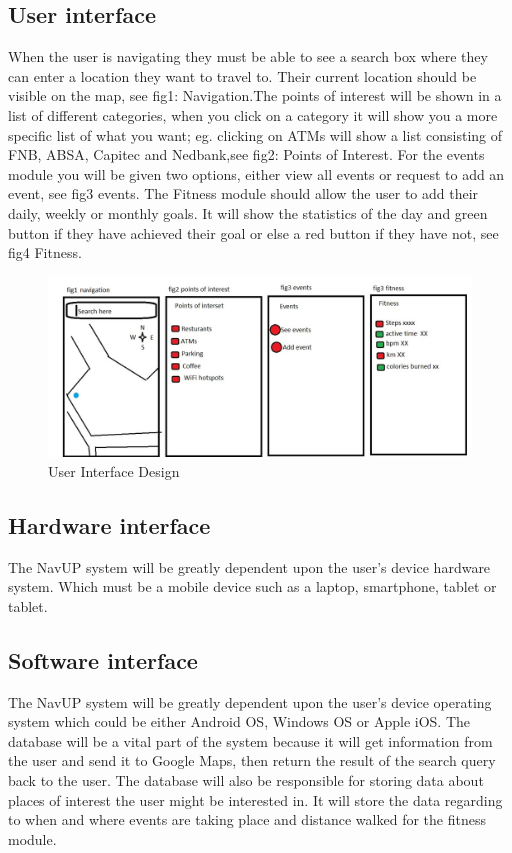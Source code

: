 \documentclass[12pt,a4paper]{article}
\begin{document}
        \subsection{User interface}
        When the user is navigating they must be able to see a search box where they can enter a location they want to travel to. Their current location should be visible on the map, see fig1: Navigation.The points of interest will be shown in a list of different categories, when you click on a category it will show you a more specific list of what you want; eg. clicking on ATMs will show a list consisting of FNB, ABSA, Capitec and Nedbank,see fig2: Points of Interest. For the events module you will be given two options, either view all events or request to add an event, see fig3 events. The Fitness module should allow the user to add their daily, weekly or monthly goals. It will show the statistics of the day and green button if they have achieved their goal or else a red button if they have not, see fig4 Fitness.
        \begin{figure}
                \includegraphics[width=\linewidth]{Images/userInterface.jpg}
                \caption{User Interface Design}
        \end{figure}
        
        \subsection{Hardware interface}
        The NavUP system will be greatly dependent upon the user's device hardware system. Which must be a mobile device such as a laptop, smartphone, tablet or tablet.

        \subsection{Software interface}
        The NavUP system will be greatly dependent upon the user's device operating system which could be either Android OS, Windows OS or Apple iOS. The database will be a vital part of the system because it will get information from the user and send it to Google Maps, then return the result of the search query back to the user. The database will also be responsible for storing data about places of interest the user might be interested in. It will store the data regarding to when and where events are taking place and distance walked for the fitness module. 
\end{document}
